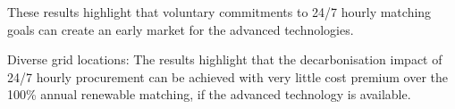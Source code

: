 \lipsum[4]

These results highlight that voluntary commitments to 24/7 hourly matching goals can create an early market for the advanced technologies.

Diverse grid locations:
The results highlight that the decarbonisation impact of 24/7 hourly procurement can be achieved with very little cost premium over the 100\% annual renewable matching, if the advanced technology is available.
